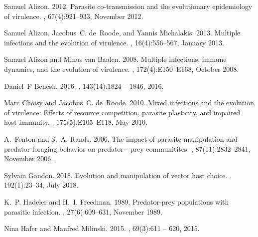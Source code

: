 \documentclass[11pt]{article}
\begin{document}
\begin{thebibliography}{24}
\providecommand{\natexlab}[1]{#1}

Samuel Alizon. 2012.
\newblock Parasite co-transmission and the evolutionary epidemiology of
  virulence.
, 67(4):921--933, November 2012.

Samuel Alizon, Jacobus~C. de~Roode, and Yannis Michalakis. 2013.
\newblock Multiple infections and the evolution of virulence.
, 16(4):556--567, January 2013.

Samuel Alizon and Minus van Baalen. 2008.
\newblock Multiple infections, immune dynamics, and the evolution of virulence.
, 172(4):E150--E168, October 2008.

Daniel~P Benesh. 2016.
, 143(14):1824 -- 1846, 2016.

Marc Choisy and Jacobus~C. de~Roode. 2010.
\newblock Mixed infections and the evolution of virulence: Effects of resource
  competition, parasite plasticity, and impaired host immunity.
, 175(5):E105--E118, May 2010.

A.~Fenton and S.~A. Rands. 2006.
\newblock The impact of parasite manipulation and predator foraging behavior on
  predator - prey communitites.
, 87(11):2832--2841, November 2006.

Sylvain Gandon. 2018.
\newblock Evolution and manipulation of vector host choice.
, 192(1):23--34, July 2018.

K.~P. Hadeler and H.~I. Freedman. 1989.
\newblock Predator-prey populations with parasitic infection.
, 27(6):609--631, November 1989.

Nina Hafer and Manfred Milinski. 2015.
, 69(3):611 -- 620, 2015.


\end{thebibliography}
\end{document}
